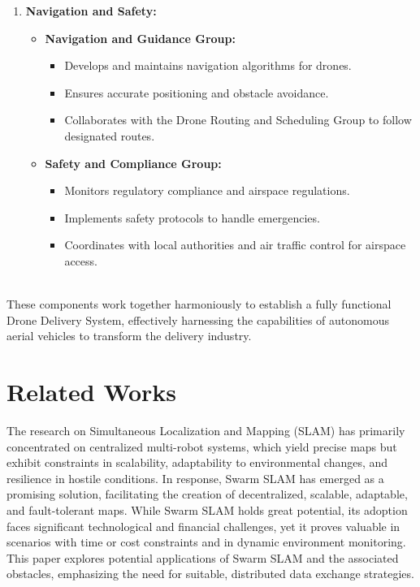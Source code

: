 \documentclass[preprint,12pt]{elsarticle}
\begin{document}
\begin{enumerate}
\item \textbf{Navigation and Safety:}
\begin{itemize}
  \item \textbf{Navigation and Guidance Group:}
    \begin{itemize}
      \item Develops and maintains navigation algorithms for drones.
      \item Ensures accurate positioning and obstacle avoidance.
      \item Collaborates with the Drone Routing and Scheduling Group to follow designated routes.
    \end{itemize}
  \item \textbf{Safety and Compliance Group:}
    \begin{itemize}
      \item Monitors regulatory compliance and airspace regulations.
      \item Implements safety protocols to handle emergencies.
      \item Coordinates with local authorities and air traffic control for airspace access.
    \end{itemize}
\end{itemize}

\end{enumerate}\\

These components work together harmoniously to establish a fully functional Drone Delivery System, effectively harnessing the capabilities of autonomous aerial vehicles to transform the delivery industry.

\section{Related Works}

The research on Simultaneous Localization and Mapping (SLAM) has primarily concentrated on centralized multi-robot systems, which yield precise maps but exhibit constraints in scalability, adaptability to environmental changes, and resilience in hostile conditions. In response, Swarm SLAM has emerged as a promising solution, facilitating the creation of decentralized, scalable, adaptable, and fault-tolerant maps. While Swarm SLAM holds great potential, its adoption faces significant technological and financial challenges, yet it proves valuable in scenarios with time or cost constraints and in dynamic environment monitoring. This paper explores potential applications of Swarm SLAM and the associated obstacles, emphasizing the need for suitable, distributed data exchange strategies\cite{li2018review}.
\end{document}
